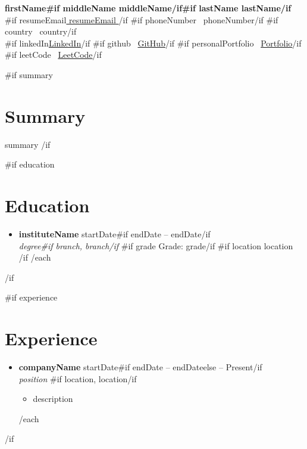 \documentclass[11pt,a4paper]{article}
\newcommand{\resumeItem}[1]{\item\small{#1}}
\newcommand{\link}[2]{\href{#1}{#2}}
\begin{document}
\begin{center}
  {\Huge\bfseries\color{primary}
    {{firstName}}{{#if middleName}} {{middleName}}{{/if}}{{#if lastName}} {{lastName}}{{/if}}
  }\\[6pt]
  \small
  {{#if resumeEmail}}\link{mailto:{{resumeEmail}} }{ {{resumeEmail}} }{{/if}}%
  {{#if phoneNumber}} \textbullet\ {{phoneNumber}}{{/if}}%
  {{#if country}} \textbullet\ {{country}}{{/if}}\\[3pt]
  {{#if linkedIn}}\link{ {{linkedIn}} }{LinkedIn}{{/if}}%
  {{#if github}} \textbullet\ \link{ {{github}} }{GitHub}{{/if}}%
  {{#if personalPortfolio}} \textbullet\ \link{ {{personalPortfolio}} }{Portfolio}{{/if}}%
  {{#if leetCode}} \textbullet\ \link{ {{leetCode}} }{LeetCode}{{/if}}
\end{center}

{{#if summary}}
\section{Summary}
\small{}{{summary}}
{{/if}}

{{#if education}}
\section{Education}
\begin{itemize}[leftmargin=0pt, label={}]
{{#each education}}
  \item
    \textbf{ {{instituteName}} }
    \hfill
    \textcolor{muted}{\small{}{{startDate}}{{#if endDate}} -- {{endDate}}{{/if}} }\\
    \textit{ {{degree}}{{#if branch}}, {{branch}}{{/if}} }%
    {{#if grade}} \hfill Grade: {{grade}}{{/if}}%
    {{#if location}} \hfill \textcolor{muted}{\small{}{{location}} }{{/if}}
  \vspace{2pt}
{{/each}}
\end{itemize}
{{/if}}

{{#if experience}}
\section{Experience}
\begin{itemize}[leftmargin=0pt, label={}]
{{#each experience}}
  \item
    \textbf{ {{companyName}} }
    \hfill
    \textcolor{muted}{\small{}{{startDate}}{{#if endDate}} -- {{endDate}}{{else}} -- Present{{/if}} }\\
    \textit{ {{position}} }{{#if location}}, {{location}}{{/if}}\\[2pt]
    \begin{itemize}[leftmargin=12pt]
      \resumeItem{\small{}{{description}} }
    \end{itemize}
  \vspace{4pt}
{{/each}}
\end{itemize}
{{/if}}
\end{document}
